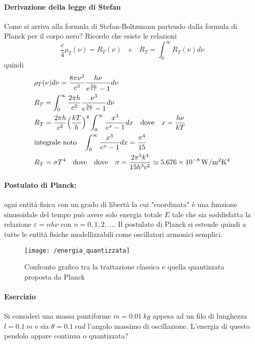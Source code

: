 \paragraph{Derivazione della legge di Stefan}
Come si arriva alla formula di Stefan-Boltzmann partendo dalla formula di Planck per il corpo nero?
Ricordo che esiste le relazioni
$$\frac{ c}{4 } \rho_T(\nu) = R_T(\nu) \quad e \quad R_T = \int_0^{\infty} R_T(\nu)d\nu$$
quindi
\begin{equation}
\begin{split}
& \rho_T(\nu) d\nu = \frac{ 8\pi\nu^2}{c^3 } \frac{ h\nu}{ e^{ \frac{ h\nu}{kT }} - 1} d\nu \\
& R_T = \int_0^{\infty} \frac{ 2\pi h}{c^2 } \frac{ \nu^3}{e^{ \frac{ h\nu}{kT } } - 1 } d\nu \\
& R_T = \frac{ 2\pi h}{c^2 } \Bigl(  \frac{ kT}{h }  \Bigr)^4 \int_0^{\infty} \frac{ x^3}{e^x - 1 }dx \quad \mbox{dove} \quad x=\frac{ h\nu}{kT }\\
& \mbox{integrale noto} \quad \int_0^{\infty} \frac{ x^3}{e^x - 1 }dx = \frac{ \pi^4}{15 } \\
& R_T = \sigma T^4 \quad \mbox{dove} \quad \mbox{dove}\quad \sigma = \frac{ 2\pi^5 k^4}{15 h^3 c^2 } \simeq \SI{5.676e-8}{W / m^2 K^4}
\end{split}
\end{equation}

\paragraph{Postulato di Planck:} ogni entità fisica con un grado di libertà la cui "coordinata" è una funzione sinusoidale del tempo può avere solo energia totale $E$ tale che sia soddisfatta la relazione $\varepsilon = n h \nu$ con $n=0,1,2, ...$.
Il postulato di Planck si estende quindi a tutte le entità fisiche modellizzabili come oscillatori armonici semplici.

\begin{figure}[h]
\centering
\texttt{[image: /energia\_quantizzata]}
\caption{Confronto grafico tra la trattazione classica e quella quantizzata proposta da Planck}
\end{figure} 

\newpage

\paragraph{Esercizio}

Si consideri una massa puntiforme $m=\SI{0.01}{kg}$ appesa ad un filo di lunghezza $l=\SI{0.1}{m}$ e sia $\theta=\SI{0.1}{rad}$ l'angolo massimo di oscillazione. L'energia di questo pendolo appare continua o quantizzata? \\

